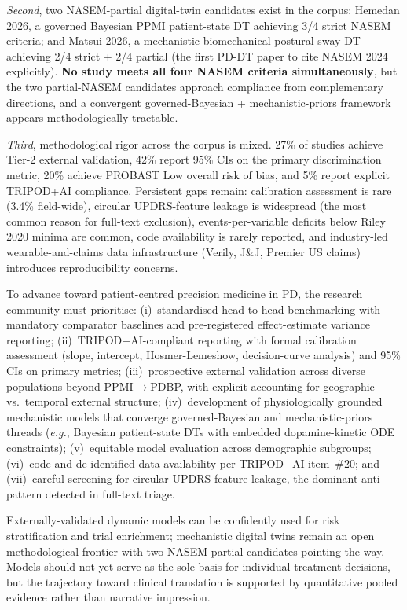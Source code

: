 \emph{Second}, two NASEM-partial digital-twin candidates exist in the corpus: Hemedan 2026, a governed Bayesian PPMI patient-state DT achieving 3/4 strict NASEM criteria; and Matsui 2026, a mechanistic biomechanical postural-sway DT achieving 2/4 strict + 2/4 partial (the first PD-DT paper to cite NASEM 2024 explicitly). \textbf{No study meets all four NASEM criteria simultaneously}, but the two partial-NASEM candidates approach compliance from complementary directions, and a convergent governed-Bayesian + mechanistic-priors framework appears methodologically tractable.

\emph{Third}, methodological rigor across the corpus is mixed. 27\% of studies achieve Tier-2 external validation, 42\% report 95\% CIs on the primary discrimination metric, 20\% achieve PROBAST Low overall risk of bias, and 5\% report explicit TRIPOD+AI compliance. Persistent gaps remain: calibration assessment is rare (3.4\% field-wide), circular UPDRS-feature leakage is widespread (the most common reason for full-text exclusion), events-per-variable deficits below Riley 2020 minima are common, code availability is rarely reported, and industry-led wearable-and-claims data infrastructure (Verily, J\&J, Premier US claims) introduces reproducibility concerns.

To advance toward patient-centred precision medicine in PD, the research community must prioritise: (i)~standardised head-to-head benchmarking with mandatory comparator baselines and pre-registered effect-estimate variance reporting; (ii)~TRIPOD+AI-compliant reporting with formal calibration assessment (slope, intercept, Hosmer-Lemeshow, decision-curve analysis) and 95\% CIs on primary metrics; (iii)~prospective external validation across diverse populations beyond PPMI$\rightarrow$PDBP, with explicit accounting for geographic vs.\ temporal external structure; (iv)~development of physiologically grounded mechanistic models that converge governed-Bayesian and mechanistic-priors threads (\textit{e.g.}, Bayesian patient-state DTs with embedded dopamine-kinetic ODE constraints); (v)~equitable model evaluation across demographic subgroups; (vi)~code and de-identified data availability per TRIPOD+AI item~\#20; and (vii)~careful screening for circular UPDRS-feature leakage, the dominant anti-pattern detected in full-text triage.

Externally-validated dynamic models can be confidently used for risk stratification and trial enrichment; mechanistic digital twins remain an open methodological frontier with two NASEM-partial candidates pointing the way. Models should not yet serve as the sole basis for individual treatment decisions, but the trajectory toward clinical translation is supported by quantitative pooled evidence rather than narrative impression.

